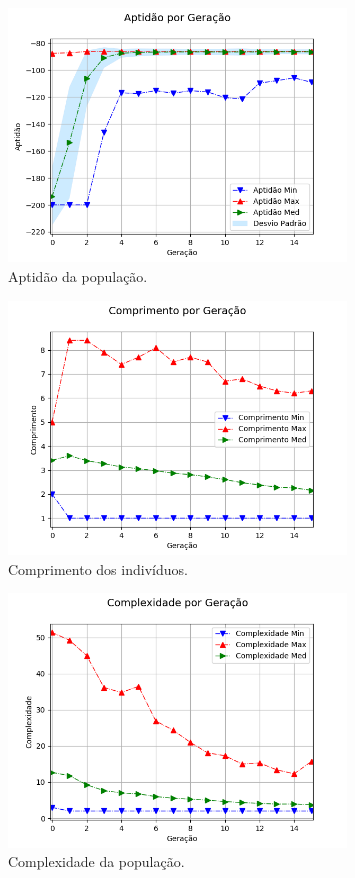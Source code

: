 \begin{figure}[H]
	\centering
	\includegraphics[width=0.8\textwidth]{02_desenvolvimento/04_EC_Fig_MCAptGer.png}
	\caption{Aptidão da população.}
	\label{fig:4ec-mcaptger}
\end{figure}

\begin{figure}[H]
	\centering
	\includegraphics[width=0.8\textwidth]{02_desenvolvimento/04_EC_Fig_MCCompr.png}
	\caption{Comprimento dos indivíduos.}
	\label{fig:4ec-mccompr}
\end{figure}

\begin{figure}[H]
	\centering
	\includegraphics[width=0.8\textwidth]{02_desenvolvimento/04_EC_Fig_MCCompl.png}
	\caption{Complexidade da população.}
	\label{fig:4ec-mccompl}
\end{figure}

